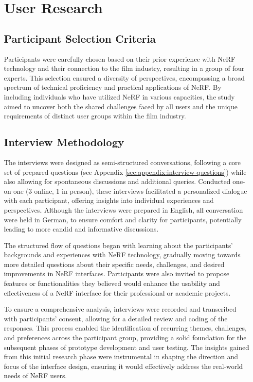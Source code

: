 %
\chapter{User Research}
\label{sec:user-research}

\section{Participant Selection Criteria}
\label{sec:user-research:criteria}

Participants were carefully chosen based on their prior experience with NeRF technology and their connection to the film industry, resulting in a group of four experts. 
This selection ensured a diversity of perspectives, encompassing a broad spectrum of technical proficiency and practical applications of NeRF. 
By including individuals who have utilized NeRF in various capacities, the study aimed to uncover both the shared challenges faced by all users and the unique requirements of distinct user groups within the film industry.

\section{Interview Methodology}
\label{sec:user-research:interview}

The interviews were designed as semi-structured conversations, following a core set of prepared questions (see Appendix \ref{sec:appendix:interview-questions}) while also allowing for spontaneous discussions and additional queries. 
Conducted one-on-one (3 online, 1 in person), these interviews facilitated a personalized dialogue with each participant, offering insights into individual experiences and perspectives. 
Although the interviews were prepared in English, all conversation were held in German, to ensure comfort and clarity for participants, potentially leading to more candid and informative discussions.

The structured flow of questions began with learning about the participants' backgrounds and experiences with NeRF technology, gradually moving towards more detailed questions about their specific needs, challenges, and desired improvements in NeRF interfaces. 
Participants were also invited to propose features or functionalities they believed would enhance the usability and effectiveness of a NeRF interface for their professional or academic projects.

To ensure a comprehensive analysis, interviews were recorded and transcribed with participants' consent, allowing for a detailed review and coding of the responses. 
This process enabled the identification of recurring themes, challenges, and preferences across the participant group, providing a solid foundation for the subsequent phases of prototype development and user testing. 
The insights gained from this initial research phase were instrumental in shaping the direction and focus of the interface design, ensuring it would effectively address the real-world needs of NeRF users.


